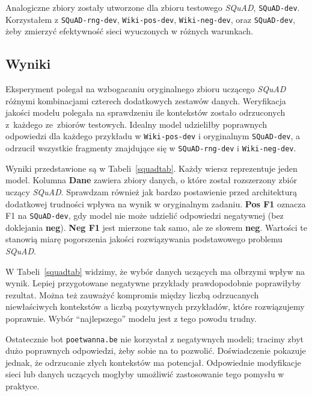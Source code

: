 Analogiczne zbiory zostały utworzone dla zbioru testowego \textit{SQuAD}, \texttt{SQuAD-dev}. Korzystałem z \texttt{SQuAD-rng-dev}, \texttt{Wiki-pos-dev}, \texttt{Wiki-neg-dev}, oraz \texttt{SQuAD-dev}, żeby zmierzyć efektywność sieci wyuczonych w różnych warunkach.

\subsection{Wyniki}

Eksperyment polegał na wzbogacaniu oryginalnego zbioru uczącego \textit{SQuAD} różnymi kombinacjami czterech dodatkowych zestawów danych. Weryfikacja jakości modelu polegała na sprawdzeniu ile kontekstów zostało odrzuconych z~każdego ze~zbiorów testowych. Idealny model udzieliłby poprawnych odpowiedzi dla każdego przykładu w \texttt{Wiki-pos-dev} i oryginalnym \texttt{SQuAD-dev}, a odrzucił wszystkie fragmenty znajdujące się w \texttt{SQuAD-rng-dev} i \texttt{Wiki-neg-dev}.

Wyniki przedstawione są w Tabeli~\ref{squadtab}. Każdy wiersz reprezentuje jeden model. Kolumna \textbf{Dane} zawiera zbiory danych, o które został rozszerzony zbiór uczący \textit{SQuAD}. Sprawdzam również jak bardzo postawienie przed architekturą dodatkowej trudności wpływa na wynik w oryginalnym zadaniu. \textbf{Pos F1} oznacza F1 na \texttt{SQuAD-dev}, gdy model nie może udzielić odpowiedzi negatywnej (bez doklejania \textbf{neg}). \textbf{Neg F1} jest mierzone tak samo, ale ze słowem \textbf{neg}. Wartości te stanowią miarę pogorszenia jakości rozwiązywania podstawowego problemu \textit{SQuAD}.

W Tabeli~\ref{squadtab} widzimy, że wybór danych uczących ma olbrzymi wpływ na wynik. Lepiej przygotowane negatywne przykłady prawdopodobnie poprawiłyby rezultat. Można też zauważyć kompromis między liczbą odrzucanych niewłaściwych kontekstów a liczbą pozytywnych przykładów, które rozwiązujemy poprawnie. Wybór ``najlepszego'' modelu jest z tego powodu trudny.

Ostatecznie bot \texttt{poetwanna.be} nie korzystał z negatywnych modeli; tracimy zbyt dużo poprawnych odpowiedzi, żeby sobie na to pozwolić. Doświadczenie pokazuje jednak, że odrzucanie złych kontekstów ma potencjał. Odpowiednie modyfikacje sieci lub danych uczących mogłyby umożliwić zastosowanie tego pomysłu w praktyce.

